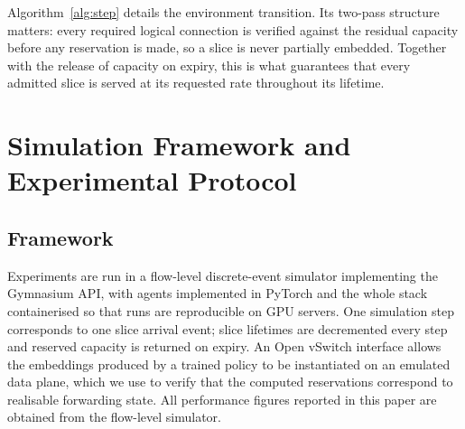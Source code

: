 \documentclass[10pt,journal,comsoc]{IEEEtran}
\begin{document}
Algorithm~\ref{alg:step} details the environment transition. Its two-pass
structure matters: every required logical connection is verified against
the residual capacity before any reservation is made, so a slice is never
partially embedded. Together with the release of capacity on expiry, this
is what guarantees that every admitted slice is served at its requested
rate throughout its lifetime.

\section{Simulation Framework and Experimental Protocol} \label{expSetup}

\subsection{Framework}
Experiments are run in a flow-level discrete-event simulator implementing
the Gymnasium API, with agents implemented in PyTorch and the whole stack
containerised so that runs are reproducible on GPU servers. One
simulation step corresponds to one slice arrival event; slice lifetimes
are decremented every step and reserved capacity is returned on expiry.
An Open vSwitch interface allows the embeddings produced by a trained
policy to be instantiated on an emulated data plane, which we use to
verify that the computed reservations correspond to realisable
forwarding state. All performance figures reported in this paper are
obtained from the flow-level simulator.
\end{document}
